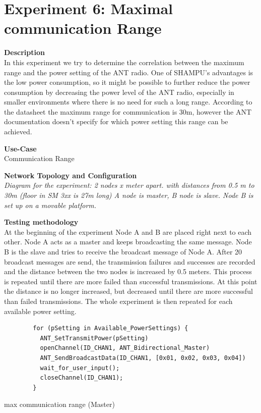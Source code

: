 \section{Experiment 6: Maximal communication Range}
\begin{description} 
	\item{\textbf{Description}} \hfill \\  In this experiment we try to determine the correlation between the maximum range and the power setting of the ANT radio. One of SHAMPU's advantages is the low power consumption, so it might be possible to further reduce the power consumption by decreasing the power level of the ANT radio, especially in smaller environments where there is no need for such a long range.
	According to the datasheet the maximum range for communication is 30m, however the ANT documentation doesn't specify for which power setting this range can be achieved. 

	\item{\textbf{Use-Case}} \hfill \\ Communication Range		
	\item{\textbf{Network Topology and Configuration}} \hfill \\ \textit{Diagram for the experiment:  2 nodes   x meter apart.  with distances from 0.5 m to 30m  (floor in SM 3xx is 27m long)  A node is master, B node is slave. Node B is set up on a movable platform.}\\  

	\item{\textbf{Testing methodology}} \hfill \\ At the beginning of the experiment Node A and B are placed right next to each other. Node A acts as a master and keeps broadcasting the same message. Node B is the slave and tries to receive the broadcast message of Node A. After 20 broadcast messages are send, the transmission failures and successes are recorded and the distance between the two nodes is increased by 0.5 meters. This process is repeated until there are more failed than successful transmissions. At this point the distance is no longer increased, but decreased until there are more successful than failed transmissions. The whole experiment is then repeated for each available power setting.
	
	\begin{code}
		\begin{verbatim}
		for (pSetting in Available_PowerSettings) {
		  ANT_SetTransmitPower(pSetting)
		  openChannel(ID_CHAN1, ANT_Bidirectional_Master)
		  ANT_SendBroadcastData(ID_CHAN1, [0x01, 0x02, 0x03, 0x04])
		  wait_for_user_input();
		  closeChannel(ID_CHAN1);
		}
		\end{verbatim}
		\caption{max communication range (Master)}\label{lst:mExp6}
	\end{code}
	

\end{description}
